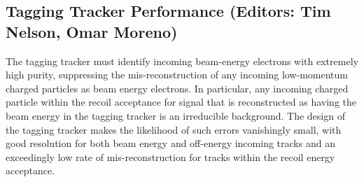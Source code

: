 
\subsection{Tagging Tracker Performance (Editors: Tim Nelson, Omar Moreno)}

The tagging tracker must identify incoming beam-energy electrons with extremely high purity, suppressing the mis-reconstruction of any incoming low-momentum charged particles as beam energy electrons. In particular, any incoming charged particle within the recoil acceptance for signal that is reconstructed as having the beam energy in the tagging tracker is an irreducible background. The design of the tagging tracker makes the likelihood of such errors vanishingly small, with good resolution for both beam energy and off-energy incoming tracks and an exceedingly low rate of mis-reconstruction for tracks within the recoil energy acceptance.

